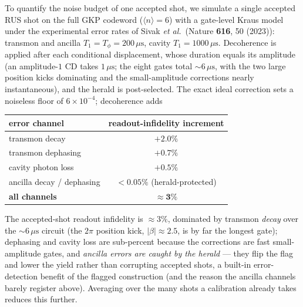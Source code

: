 \documentclass[11pt]{article}
\begin{document}
To quantify the noise budget of one accepted shot, we simulate a single accepted RUS shot on the full GKP
codeword ($\langle n\rangle=6$) with a gate-level Kraus model under the experimental error rates of
Sivak \emph{et al.}\ (Nature \textbf{616}, 50 (2023)): transmon and ancilla
$T_1=T_\phi=200\,\mu\mathrm{s}$, cavity $T_1=1000\,\mu\mathrm{s}$. Decoherence is applied after each
conditional displacement, whose duration equals its amplitude (an amplitude-$1$ CD takes
$1\,\mu\mathrm{s}$; the eight gates total $\sim\!6\,\mu\mathrm{s}$, with the two large position kicks
dominating and the small-amplitude corrections nearly instantaneous), and the herald is post-selected.
The exact ideal correction sets a noiseless floor of $6\times10^{-4}$; decoherence adds
\begin{center}
\begin{tabular}{lc}
\toprule
error channel & readout-infidelity increment\\
\midrule
transmon decay & $+2.0\%$\\
transmon dephasing & $+0.7\%$\\
cavity photon loss & $+0.5\%$\\
ancilla decay / dephasing & $<0.05\%$ (herald-protected)\\
\midrule
\textbf{all channels} & $\boldsymbol{\approx3\%}$\\
\bottomrule
\end{tabular}
\end{center}
The accepted-shot readout infidelity is $\approx3\%$, dominated by transmon \emph{decay} over the
$\sim\!6\,\mu\mathrm{s}$ circuit (the $2\pi$ position kick, $|\beta|\!\approx\!2.5$, is by far the
longest gate); dephasing and cavity loss are sub-percent because the corrections are fast
small-amplitude gates, and \emph{ancilla errors are caught by the
herald} --- they flip the flag and lower the yield rather than corrupting accepted shots, a built-in
error-detection benefit of the flagged construction (and the reason the ancilla channels barely
register above). Averaging over the many shots a calibration already takes reduces this further.
\end{document}
